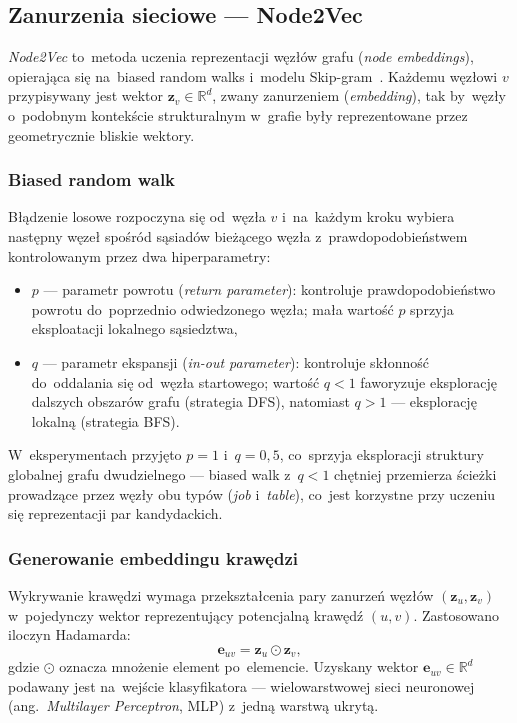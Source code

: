 \subsection{Zanurzenia sieciowe — Node2Vec}
\label{sec:node2vec}

\emph{Node2Vec} to~metoda uczenia reprezentacji węzłów grafu
(\emph{node embeddings}), opierająca się na~biased random walks
i~modelu Skip-gram~\cite{LibenNowell2007}. Każdemu węzłowi $v$
przypisywany jest wektor $\mathbf{z}_v \in \mathbb{R}^d$, zwany
zanurzeniem (\emph{embedding}), tak by~węzły o~podobnym kontekście
strukturalnym w~grafie były reprezentowane przez geometrycznie bliskie
wektory.

\subsubsection{Biased random walk}

Błądzenie losowe rozpoczyna się od~węzła $v$ i~na~każdym kroku
wybiera następny węzeł spośród sąsiadów bieżącego węzła
z~prawdopodobieństwem kontrolowanym przez dwa hiperparametry:

\begin{itemize}
  \item $p$ — parametr powrotu (\emph{return parameter}): kontroluje
        prawdopodobieństwo powrotu do~poprzednio odwiedzonego węzła;
        mała wartość $p$ sprzyja eksploatacji lokalnego sąsiedztwa,
  \item $q$ — parametr ekspansji (\emph{in-out parameter}): kontroluje
        skłonność do~oddalania się od~węzła startowego; wartość $q < 1$
        faworyzuje eksplorację dalszych obszarów grafu (strategia DFS),
        natomiast $q > 1$ — eksplorację lokalną (strategia BFS).
\end{itemize}

W~eksperymentach przyjęto $p = 1$ i~$q = 0{,}5$, co~sprzyja
eksploracji struktury globalnej grafu dwudzielnego — biased walk
z~$q < 1$ chętniej przemierza ścieżki prowadzące przez węzły obu
typów (\emph{job} i~\emph{table}), co~jest korzystne przy uczeniu
się reprezentacji par kandydackich.

\subsubsection{Generowanie embeddingu krawędzi}

Wykrywanie krawędzi wymaga przekształcenia pary zanurzeń węzłów
$(\mathbf{z}_u, \mathbf{z}_v)$ w~pojedynczy wektor reprezentujący
potencjalną krawędź $(u, v)$. Zastosowano iloczyn Hadamarda:
%
\[
  \mathbf{e}_{uv} = \mathbf{z}_u \odot \mathbf{z}_v,
\]
%
gdzie $\odot$ oznacza mnożenie element po~elemencie. Uzyskany
wektor $\mathbf{e}_{uv} \in \mathbb{R}^d$ podawany jest na~wejście
klasyfikatora — wielowarstwowej sieci neuronowej (ang.\
\emph{Multilayer Perceptron}, MLP) z~jedną warstwą ukrytą.

